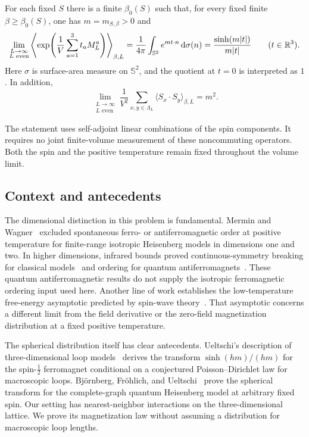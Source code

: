 \begin{theorem}\label{thm:main}
For each fixed $S$ there is a finite $\beta_0(S)$ such that, for every
fixed finite $\beta\ge\beta_0(S)$, one has $m=m_{S,\beta}>0$ and
\begin{equation}\label{eq:spherical-law}
 \lim_{\substack{L\to\infty\\L\text{ even}}}
  \left\langle
     \exp\!\left(\frac1V\sum_{a=1}^3t_aM_L^a\right)
  \right\rangle_{\beta,L}
   =\frac1{4\pi}\int_{\mathbb S^2}e^{m t\cdot n}\,\mathrm d\sigma(n)
   =\frac{\sinh(m|t|)}{m|t|}
 \qquad(t\in\mathbb R^3).
\end{equation}
Here $\sigma$ is surface-area measure on $\mathbb S^2$, and the quotient
at $t=0$ is interpreted as $1$. In addition,
\begin{equation}\label{eq:second-moment-law}
 \lim_{\substack{L\to\infty\\L\text{ even}}}
   \frac1{V^2}\sum_{x,y\in\Lambda_L}
          \langle S_x\cdot S_y\rangle_{\beta,L}=m^2.
\end{equation}
\end{theorem}

The statement uses self-adjoint linear combinations of the spin
components. It requires no joint finite-volume measurement of these
noncommuting operators. Both the spin and the positive temperature remain
fixed throughout the volume limit.

\subsection{Context and antecedents}\label{subsec:history}
The dimensional distinction in this problem is fundamental. Mermin and
Wagner~\cite{MerminWagner1966} excluded spontaneous ferro- or
antiferromagnetic order at positive temperature for finite-range
isotropic Heisenberg models in dimensions one and
two. In higher dimensions, infrared bounds proved continuous-symmetry
breaking for classical models~\cite{FSS1976} and ordering for quantum
antiferromagnets~\cite{DLS1978}. These quantum antiferromagnetic results
do not supply the isotropic ferromagnetic ordering input used here.
Another line of work establishes the low-temperature free-energy
asymptotic predicted by spin-wave theory~\cite{CGS2015}. That asymptotic
concerns a different limit from the field derivative or the zero-field
magnetization distribution at a fixed positive temperature.

The spherical distribution itself has clear antecedents. Ueltschi's
description of three-dimensional loop models~\cite[Section~8.1]{Ueltschi2017}
derives the transform $\sinh(hm)/(hm)$ for the spin-$\tfrac12$
ferromagnet conditional on a conjectured Poisson--Dirichlet law for
macroscopic loops. Bj\"ornberg, Fr\"ohlich, and
Ueltschi~\cite[Theorem~2.1]{BFU2020} prove the spherical transform
for the complete-graph quantum Heisenberg model at arbitrary fixed spin.
Our setting has nearest-neighbor interactions on the three-dimensional
lattice. We prove its magnetization law without assuming a distribution
for macroscopic loop lengths.

